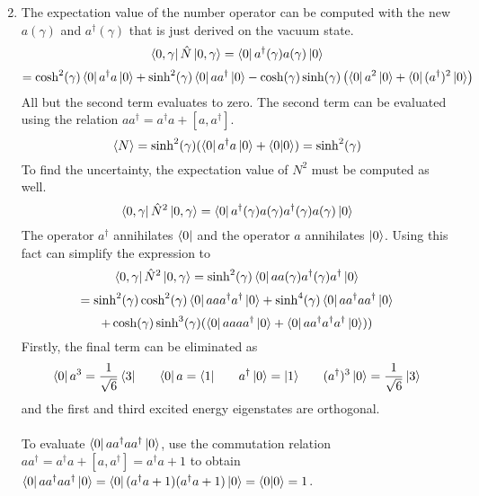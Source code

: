 \begin{sol}
\begin{enumerate}[label=\textbf{(\alph*)}]
\begin{equation}
\end{equation}
\item
The expectation value of the number operator can be computed with the new $a(\gamma)$ and $a^\dagger(\gamma)$ that is just derived on the vacuum state.
\begin{equation}
	\bra{0,\gamma}\hat N\ket{0,\gamma}=\bra0 a^\dagger(\gamma)a(\gamma)\ket0
\end{equation}
\begin{equation}
	=\cosh^2(\gamma)\bra0 a^\dagger a\ket0+\sinh^2(\gamma)\bra0 aa^\dagger\ket0-\cosh(\gamma)\sinh(\gamma)\left(\bra0 a^2\ket0+\bra0 (a^\dagger)^2\ket0\right)
\end{equation}   
All but the second term evaluates to zero. The second term can be evaluated using the relation $aa^\dagger=a^\dagger a+[a,a^\dagger]$.
\begin{equation}
	\langle N\rangle = \sinh^2(\gamma)(\bra0a^\dagger a\ket0+\braket{0}{0})=\sinh^2(\gamma)
\end{equation}
To find the uncertainty, the expectation value of $N^2$ must be computed as well.
\begin{equation}
	\bra{0,\gamma}\hat N^2\ket{0,\gamma}=\bra0a^\dagger(\gamma)a(\gamma)a^\dagger(\gamma)a(\gamma)\ket0
\end{equation}
The operator $a^\dagger$ annihilates $\bra0$ and the operator $a$ annihilates $\ket0$. Using this fact can simplify the expression to 
\begin{equation}
	\bra{0,\gamma}\hat N^2\ket{0,\gamma}=\sinh^2(\gamma)\bra0aa(\gamma)a^\dagger(\gamma)a^\dagger\ket0
\end{equation}
\begin{equation}
	=\sinh^2(\gamma)\cosh^2(\gamma)\bra0aaa^\dagger a^\dagger\ket0+\sinh^4(\gamma)\bra0aa^\dagger aa^\dagger\ket0
\end{equation}
\begin{equation}
	+\cosh(\gamma)\sinh^3(\gamma)(\bra0aaaa^\dagger\ket0+\bra0aa^\dagger a^\dagger a^\dagger\ket0))
\end{equation}  
Firstly, the final term can be eliminated as
\begin{equation}
	\bra0 a^3=\frac{1}{\sqrt{6}}\bra 3\:\:\:\:\:\:\:\:\bra0 a=\bra1\:\:\:\:\:\:\:\:a^\dagger\ket0=\ket1\:\:\:\:\:\:\:\:(a^\dagger)^3\ket0=\frac{1}{\sqrt{6}}\ket3
\end{equation} 
and the first and third excited energy eigenstates are orthogonal. \\\\
To evaluate $\bra0aa^\dagger aa^\dagger\ket0$, use the commutation relation $aa^\dagger=a^\dagger a+[a,a^\dagger]=a^\dagger a+1$ to obtain $\bra0aa^\dagger aa^\dagger\ket0=\bra0(a^\dagger a+1)(a^\dagger a+1)\ket0=\braket{0}{0}=1$. 

\end{enumerate}
\end{sol}
